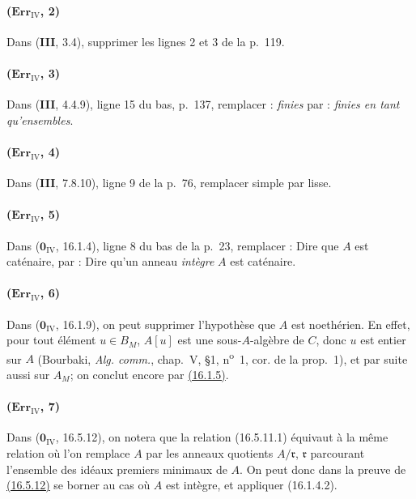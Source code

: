 \paragraph{($\mathbf{Err}_{\mathrm{IV}}$, 2)}
Dans (\textbf{III}, 3.4), supprimer les lignes 2 et 3 de la p.~119.

\paragraph{($\mathbf{Err}_{\mathrm{IV}}$, 3)}
Dans (\textbf{III}, 4.4.9), ligne 15 du bas, p.~137, remplacer : \emph{finies} par :
\emph{finies en tant qu'ensembles}.

\paragraph{($\mathbf{Err}_{\mathrm{IV}}$, 4)}
Dans (\textbf{III}, 7.8.10), ligne 9 de la p.~76, remplacer simple par lisse.

\paragraph{($\mathbf{Err}_{\mathrm{IV}}$, 5)}
Dans ($\mathbf{0}_{\mathrm{IV}}$, 16.1.4), ligne 8 du bas de la p.~23, remplacer :
Dire que $A$ est caténaire, par : Dire qu'un anneau \emph{intègre} $A$ est
caténaire.

\paragraph{($\mathbf{Err}_{\mathrm{IV}}$, 6)}
Dans ($\mathbf{0}_{\mathrm{IV}}$, 16.1.9), on peut supprimer l'hypothèse que
$A$ est noethérien. En effet, pour tout élément $u\in B_M$, $A[u]$
est une sous-$A$-algèbre de $C$, donc $u$ est entier sur $A$ (Bourbaki,
\emph{Alg. comm.}, chap.~V, \S1, n\textsuperscript{o}~1, cor. de la
prop.~1), et par suite aussi sur $A_M$; on conclut encore par
{\hyperlink{ega4.c04.prop.16-1-5}{(16.1.5)}}.

\paragraph{($\mathbf{Err}_{\mathrm{IV}}$, 7)}
Dans ($\mathbf{0}_{\mathrm{IV}}$, 16.5.12), on notera que la relation
(16.5.11.1) équivaut à la même relation où l'on remplace $A$ par les
anneaux quotients $A/\mathfrak r$, $\mathfrak r$ parcourant l'ensemble
des idéaux premiers minimaux de $A$. On peut donc dans la preuve de
{\hyperlink{ega4.c04.statement.16-5-12}{(16.5.12)}} se borner au cas
où $A$ est intègre, et appliquer (16.1.4.2).

